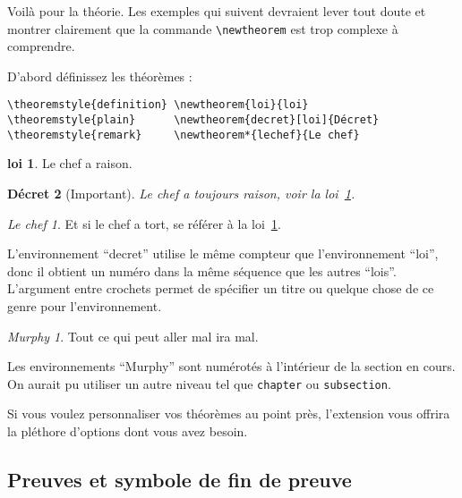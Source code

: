 Voilà pour la théorie. Les exemples qui suivent devraient lever tout
doute et montrer clairement que la commande \verb|\newtheorem| est
trop complexe à comprendre.

\theoremstyle{definition} \newtheorem{loi}{loi}
\theoremstyle{plain}      \newtheorem{decret}[loi]{Décret}
\theoremstyle{remark}     \newtheorem*{lechef}{Le chef}

D'abord définissez les théorèmes :

\begin{verbatim}
\theoremstyle{definition} \newtheorem{loi}{loi}
\theoremstyle{plain}      \newtheorem{decret}[loi]{Décret}
\theoremstyle{remark}     \newtheorem*{lechef}{Le chef}
\end{verbatim}

\begin{example}
\begin{loi} \label{chef}
Le chef a raison.
\end{loi}
\begin{decret}[Important]
Le chef a toujours raison,
voir la loi~\ref{chef}.
\end{decret}
\begin{lechef}
Et si le chef a tort, se référer
à la loi~\ref{chef}.
\end{lechef}
\end{example}


L'environnement \enquote{decret} utilise le même compteur que l'environnement
\enquote{loi}, donc il obtient un numéro dans la même
séquence que les autres \enquote{lois}. L'argument entre crochets permet
de spécifier un titre ou quelque chose de ce genre pour l'environnement.
\begin{example}
\newtheorem{mur}{Murphy}[section]
\begin{mur} Tout ce qui peut
aller mal ira mal.\end{mur}
\end{example}

Les environnements \enquote{Murphy} sont numérotés à l'intérieur de la section
en cours. On aurait pu utiliser un autre niveau tel que \texttt{chapter}
ou \texttt{subsection}.

Si vous voulez personnaliser vos théorèmes au point près, l'extension
 vous offrira la pléthore d'options dont vous avez
besoin.

\subsection{Preuves et symbole de fin de preuve}
\label{sec:putting-qed-right}

